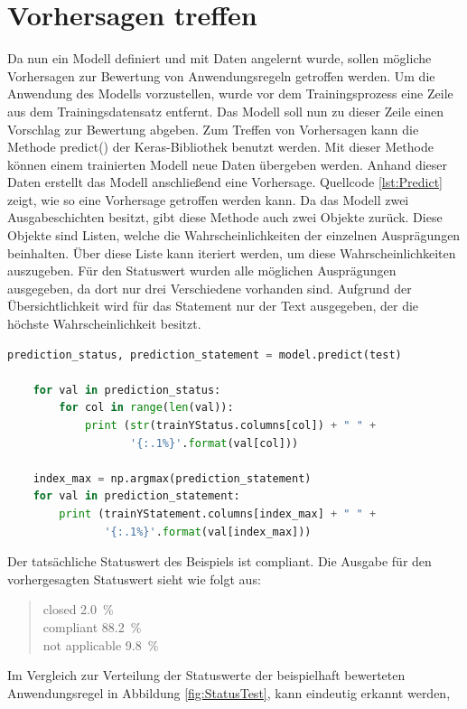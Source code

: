 \section{Vorhersagen treffen}
\label{chap:Prediction}

Da nun ein Modell definiert und mit Daten angelernt wurde, sollen mögliche Vorhersagen zur Bewertung von Anwendungsregeln getroffen werden. 
Um die Anwendung des Modells vorzustellen, wurde vor dem Trainingsprozess eine Zeile aus dem Trainingsdatensatz entfernt. 
Das Modell soll nun zu dieser Zeile einen Vorschlag zur Bewertung abgeben. Zum Treffen von Vorhersagen kann 
die Methode predict() der Keras-Bibliothek benutzt werden. Mit dieser Methode können einem trainierten Modell neue Daten übergeben werden.
Anhand dieser Daten erstellt das Modell anschließend eine Vorhersage. Quellcode \ref*{lst:Predict} zeigt, wie so eine Vorhersage getroffen werden kann.
Da das Modell zwei Ausgabeschichten besitzt, gibt diese Methode auch zwei Objekte zurück. Diese Objekte sind Listen, welche die Wahrscheinlichkeiten
der einzelnen Ausprägungen beinhalten. Über diese Liste kann iteriert werden, um diese Wahrscheinlichkeiten auszugeben. Für den Statuswert 
wurden alle möglichen Ausprägungen ausgegeben, da dort nur drei Verschiedene vorhanden sind. Aufgrund der Übersichtlichkeit wird für das Statement
nur der Text ausgegeben, der die höchste Wahrscheinlichkeit besitzt. 
\begin{lstlisting}[language = python, caption={Vorhersage über neue Daten treffen},captionpos=b, label = lst:Predict, floatplacement=H]
    prediction_status, prediction_statement = model.predict(test)

    for val in prediction_status:
        for col in range(len(val)):
            print (str(trainYStatus.columns[col]) + " " + 
                   '{:.1%}'.format(val[col]))
    
    index_max = np.argmax(prediction_statement)
    for val in prediction_statement:
        print (trainYStatement.columns[index_max] + " " + 
               '{:.1%}'.format(val[index_max]))
\end{lstlisting}
Der tatsächliche Statuswert des Beispiels ist \glqq compliant\grqq{}. Die Ausgabe für den vorhergesagten Statuswert sieht wie folgt aus:
\begin{quotation}
    \noindent closed 2.0~\%\\
    compliant 88.2~\%\\
    not applicable 9.8~\%
\end{quotation}
Im Vergleich zur Verteilung der Statuswerte der beispielhaft bewerteten Anwendungsregel in Abbildung \ref*{fig:StatusTest}, kann eindeutig erkannt werden, 
